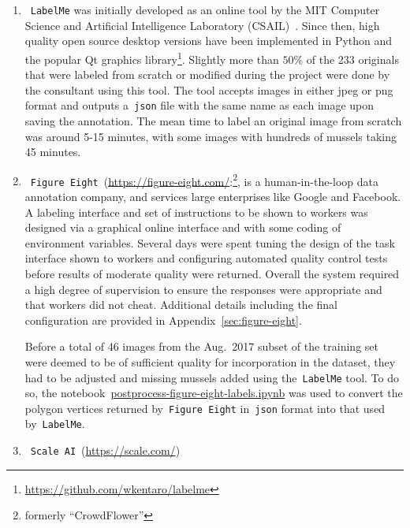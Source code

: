 \documentclass[11pt]{article} %
\begin{document}
\begin{enumerate}
\item~\texttt{LabelMe}
was initially developed as an online tool by 
the MIT Computer Science and Artificial Intelligence Laboratory
(CSAIL)~\cite{russell2008labelme}. Since then, high quality open source desktop 
versions have been implemented in Python and the popular Qt graphics 
library\footnote{\url{https://github.com/wkentaro/labelme}}. Slightly more than
$50\%$ of the 233 originals that were labeled from scratch or modified during 
the project were done by the consultant using this tool. The tool accepts 
images in either jpeg or png format and outputs a~\texttt{json} file with the 
same name as each image upon saving the annotation. The mean time to label an 
original image from scratch was around 5-15 minutes, with some images with 
hundreds of mussels taking 45 minutes.

\item~\texttt{Figure Eight}~(\url{https://figure-eight.com/}:\footnote{formerly
``CrowdFlower''}, is a human-in-the-loop data annotation company, and services 
large enterprises like Google and Facebook. A labeling interface and set of
instructions to be shown to workers was designed via a graphical online 
interface and with some coding of environment variables. Several days were
spent tuning the design of the task interface shown to workers and configuring 
automated quality control tests before results of moderate quality were 
returned. Overall the system required a high degree of supervision to ensure
the responses were appropriate and that workers did not cheat. Additional 
details including the final configuration are provided in 
Appendix~\ref{sec:figure-eight}.

Before a total of 46 images from the Aug.~2017 subset of the training set were
deemed to be of sufficient quality for incorporation in the dataset, they had 
to be adjusted and missing mussels added using the~\texttt{LabelMe} tool. To do 
so, the 
notebook~\href{https://github.com/AngusG/cciw-zebra-mussel/blob/master/labelme/figure-eight/postprocess-figure-eight-labels.ipynb}{postprocess-figure-eight-labels.ipynb}
was used to convert the polygon vertices returned by~\texttt{Figure Eight} 
in~\texttt{json} format into that used by~\texttt{LabelMe}.

\item~\texttt{Scale AI}~(\url{https://scale.com/})


\end{enumerate}
\end{document}
